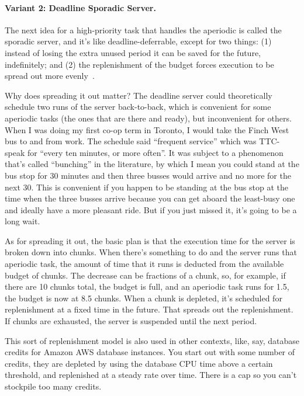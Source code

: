 \paragraph{Variant 2: Deadline Sporadic Server.}
The next idea for a high-priority task that handles the aperiodic is called the sporadic server, and it's like deadline-deferrable, except for two things: (1) instead of losing the extra unused period it can be saved for the future, indefinitely; and (2) the replenishment of the budget forces execution to be spread out more evenly~\cite{aperiodic-server}. 

Why does spreading it out matter? The deadline server could theoretically schedule two runs of the server back-to-back, which is convenient for some aperiodic tasks (the ones that are there and ready), but inconvenient for others. When I was doing my first co-op term in Toronto, I would take the Finch West bus to and from work. The schedule said ``frequent service'' which was TTC-speak for ``every ten minutes, or more often''. It was subject to a phenomenon that's called ``bunching'' in the literature, by which I mean you could stand at the bus stop for 30 minutes and then three busses would arrive and no more for the next 30. This is convenient if you happen to be standing at the bus stop at the time when the three busses arrive because you can get aboard the least-busy one and ideally have a more pleasant ride. But if you just missed it, it's going to be a long wait.

As for spreading it out, the basic plan is that the execution time for the server is broken down into chunks. When there's something to do and the server runs that aperiodic task, the amount of time that it runs is deducted from the available budget of chunks. The decrease can be fractions of a chunk, so, for example, if there are 10 chunks total, the budget is full, and an aperiodic task runs for 1.5, the budget is now at 8.5 chunks. When a chunk is depleted, it's scheduled for replenishment at a fixed time in the future. That spreads out the replenishment. If chunks are exhausted, the server is suspended until the next period.

This sort of replenishment model is also used in other contexts, like, say, database credits for Amazon AWS database instances. You start out with some number of credits, they are depleted by using the database CPU time above a certain threshold, and replenished at a steady rate over time. There is a cap  so you can't stockpile too many credits. 

